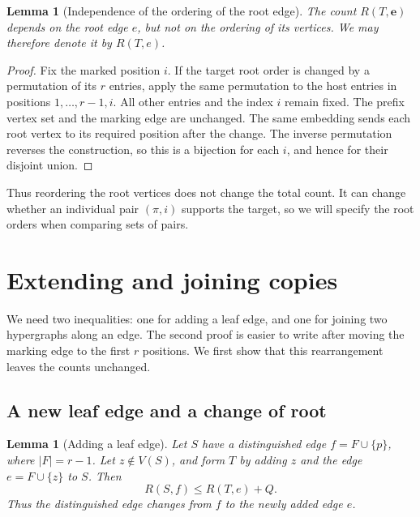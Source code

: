 \documentclass[11pt]{article}
\numberwithin{equation}{section}
\newtheorem{lemma}[theorem]{Lemma}
\theoremstyle{definition}
\begin{document}
\begin{lemma}[Independence of the ordering of the root edge]
\label{lem:root-order}
The count $R(T,\mathbf e)$ depends on the root edge $e$, but not on
the ordering of its vertices.  We may therefore denote it by $R(T,e)$.
\end{lemma}

\begin{proof}
Fix the marked position $i$.  If the target root order is changed by a
permutation of its $r$ entries, apply the same permutation to the host
entries in positions $1,\ldots,r-1,i$.  All other entries and the index
$i$ remain fixed.  The prefix vertex set and the marking edge are
unchanged.  The same embedding sends each root vertex to its required
position after the change.  The inverse
permutation reverses the construction, so this is a bijection for each
$i$, and hence for their disjoint union.
\end{proof}

Thus reordering the root vertices does not change the total count.
It can change whether an individual pair $(\pi,i)$ supports the
target, so we will specify the root orders when comparing sets of pairs.

\section{Extending and joining copies}
\label{sec:anchored-transfers}

We need two inequalities: one for adding a leaf edge, and one for
joining two hypergraphs along an edge.  The second proof is easier
to write after moving the marking edge to the first $r$ positions.
We first show that this rearrangement leaves the counts unchanged.

\subsection{A new leaf edge and a change of root}

\begin{lemma}[Adding a leaf edge]
\label{lem:anchored-leaf}
Let $S$ have a distinguished edge $f=F\cup\{p\}$, where
$|F|=r-1$.  Let $z\notin V(S)$, and form $T$ by adding $z$ and
the edge $e=F\cup\{z\}$ to $S$.  Then
\begin{equation}
 R(S,f)\leq R(T,e)+Q.
 \label{eq:anchored-leaf}
\end{equation}
Thus the distinguished edge changes from $f$ to the newly added edge $e$.
\end{lemma}
\end{document}
